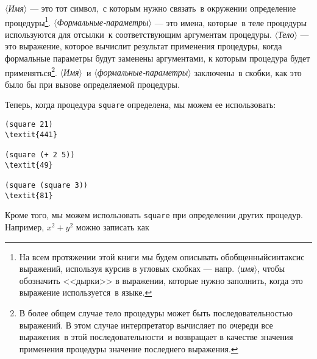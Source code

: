 \textit{$\langle$Имя$\rangle$} --- это тот символ,~с которым нужно
связать~в окружении определение процедуры\footnote{На всем протяжении этой книги мы будем описывать
обобщенныйсинтаксис выражений, используя курсив в
угловых скобках --- напр. \textit{$\langle$имя$\rangle$}, чтобы обозначить <<дырки>>
в выражении, которые нужно заполнить, когда это выражение
используется~в языке.
}.
\textit{$\langle$Формальные-параметры$\rangle$} --- это имена, которые~в теле процедуры
используются для отсылки~к соответствующим аргументам процедуры.
\textit{$\langle$Тело$\rangle$} ---
это выражение, которое вычислит результат применения
процедуры, когда формальные параметры будут заменены аргументами, к
которым процедура будет применяться\footnote{В более общем случае тело процедуры может быть
последовательностью выражений. В этом случае
интерпретатор вычисляет
по очереди все выражения~в этой последовательности~и возвращает в
качестве значения применения процедуры значение последнего
выражения.}.
\textit{$\langle$Имя$\rangle$}~и 
\textit{$\langle$формальные-параметры$\rangle$} заключены~в 
скобки, как это было бы при вызове определяемой процедуры.

Теперь, когда процедура {\tt square} определена, мы можем ее
использовать:

\begin{Verbatim}[fontsize=\small]
(square 21)
\textit{441}

(square (+ 2 5))
\textit{49}

(square (square 3))
\textit{81}
\end{Verbatim}

Кроме того, мы можем использовать
{\tt square} при определении других процедур. Например, 
$x^2 + y^2$ можно записать как

